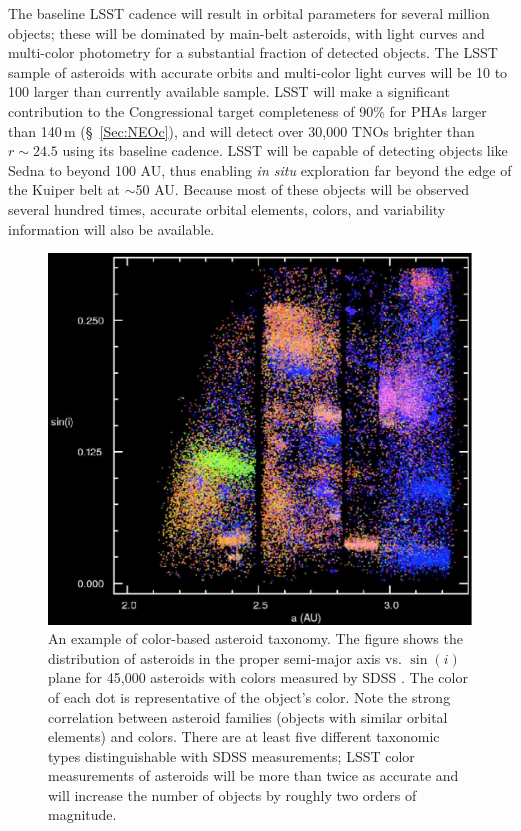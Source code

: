 The baseline LSST cadence will result in orbital parameters for several
million objects; these will be dominated by main-belt asteroids, with
light curves and multi-color photometry for a substantial fraction of detected objects.
The LSST sample of asteroids with accurate orbits and multi-color light curves
will be 10 to 100 larger than currently available sample.
LSST will make a significant contribution to the Congressional target
completeness of 90\% for PHAs larger than 140\,m (\S~\ref{Sec:NEOc}), and will detect over 30,000 TNOs brighter than $r\sim24.5$ using its baseline cadence. LSST will be capable
of detecting objects like Sedna to beyond 100 AU, thus enabling \textit{in situ} exploration
far beyond the edge of the Kuiper belt at $\sim$50 AU. Because most of these
objects will be observed several hundred times, accurate orbital elements,
colors, and variability information will also be available.


\begin{figure}
\includegraphics[width=1.0\hsize,clip]{asteroids}
\caption{An example of color-based asteroid taxonomy. The figure
shows the distribution of asteroids in the proper semi-major axis vs. $\sin(i)$
plane for 45,000 asteroids with colors measured by SDSS \citep{2008Icar..198..138P}.
The color of each dot is representative of the object's color.
Note the strong correlation between asteroid families (objects with
similar orbital elements) and colors. There are
at least five different taxonomic types distinguishable with SDSS measurements;
LSST color measurements of asteroids will be more than twice as accurate
and will increase the number of objects by roughly two orders of magnitude.}
\label{Fig:asteroids}
\end{figure}

